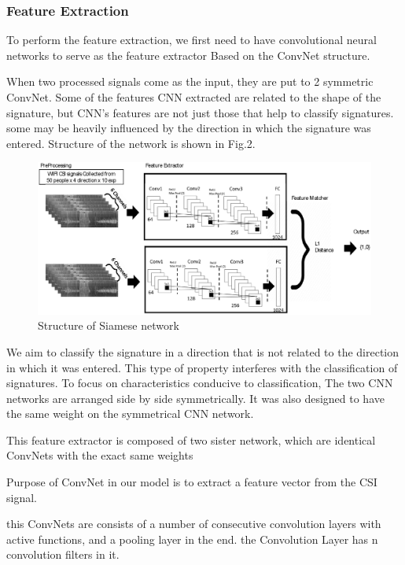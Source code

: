 \documentclass[runningheads]{llncs}
\begin{document}
\subsubsection{Feature Extraction}

To perform the feature extraction, we first need to have convolutional neural networks to serve as the feature extractor
Based on the ConvNet structure.\cite{lecun1998gradient} 

When two processed signals come as the input, they are put to 2 symmetric ConvNet. 
Some of the features CNN extracted are related to the shape of the signature, but CNN's features are not just those that help to classify signatures. some may be heavily influenced by the direction in which the signature was entered. Structure of the network is shown in Fig.2.
\begin{figure}
    \includegraphics[width=\textwidth]{network1.eps}
    \caption{Structure of Siamese network} \label{network1}
\end{figure}
We aim to classify the signature in a direction that is not related to the direction in which it was entered. This type of property interferes with the classification of signatures.
To focus on characteristics conducive to classification, The two CNN networks are arranged side by side symmetrically.
It was also designed to have the same weight on the symmetrical CNN network.


This feature extractor is composed of two sister network, which are identical ConvNets with the exact same weights

Purpose of ConvNet in our model is to extract a feature vector from the CSI signal. 

this ConvNets are consists of a number of consecutive convolution layers with active functions, and a pooling layer in the end.
the Convolution Layer has n convolution filters in it.
\end{document}

